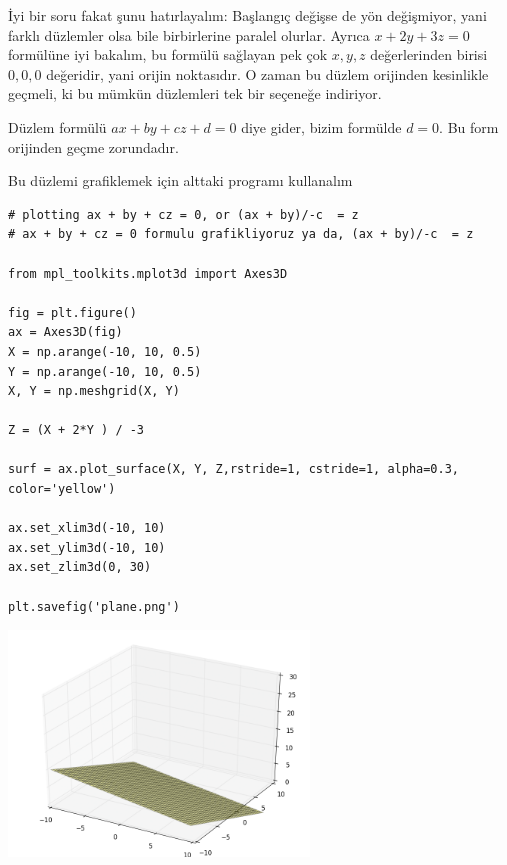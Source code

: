 \documentclass[12pt,fleqn]{article}\usepackage{../../common}
\begin{document}
İyi bir soru fakat şunu hatırlayalım: Başlangıç değişse de yön değişmiyor,
yani farklı düzlemler olsa bile birbirlerine paralel olurlar. Ayrıca $x +
2y + 3z = 0$ formülüne iyi bakalım, bu formülü sağlayan pek çok $x,y,z$
değerlerinden birisi $0,0,0$ değeridir, yani orijin noktasıdır. O zaman bu
düzlem orijinden kesinlikle geçmeli, ki bu mümkün düzlemleri tek bir
seçeneğe indiriyor.

Düzlem formülü $ax + by + cz + d= 0$ diye gider, bizim formülde $d=0$. Bu
form orijinden geçme zorundadır.

Bu düzlemi grafiklemek için alttaki programı kullanalım

\begin{verbatim}
# plotting ax + by + cz = 0, or (ax + by)/-c  = z 
# ax + by + cz = 0 formulu grafikliyoruz ya da, (ax + by)/-c  = z 

from mpl_toolkits.mplot3d import Axes3D

fig = plt.figure()
ax = Axes3D(fig)
X = np.arange(-10, 10, 0.5)
Y = np.arange(-10, 10, 0.5)
X, Y = np.meshgrid(X, Y)

Z = (X + 2*Y ) / -3

surf = ax.plot_surface(X, Y, Z,rstride=1, cstride=1, alpha=0.3, color='yellow')

ax.set_xlim3d(-10, 10)
ax.set_ylim3d(-10, 10)
ax.set_zlim3d(0, 30)

plt.savefig('plane.png')
\end{verbatim}
\includegraphics[height=6cm]{plane.png}
\end{document}

